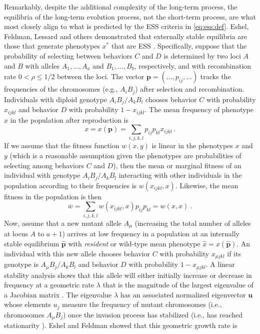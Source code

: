 \documentclass[11pt]{article}
\newcommand{\mean}[1]{\overline{#1}}
\newcommand{\w}{w}
\newcommand{\ess}[1]{#1^*}
\newcommand{\fixp}[1]{\hat{#1}}
\renewcommand{\vec}[1]{\symbf{#1}}
\newcommand{\rec}{\rho}
\newcommand{\mut}{\mu}
\newcommand{\eig}{\lambda}
\begin{document}
Remarkably, despite the additional complexity of the long-term process, the equilibria of the long-term evolution process, not the short-term process, are what most closely align to what is predicted by the ESS criteria in \eqref{eq:ess:def}. Eshel, Feldman, Lessard and others demonstrated that externally stable equilibria are those that generate phenotypes $\ess{x}$ that are ESS \cite{Eshel:Feldman:1984,Liberman:1988,Eshel:1996,Hammerstein:Selten:1994,Hammerstein:1996,Weissing:1996,Eshel:Feldman:1998}. Specifically, suppose that the probability of selecting between behaviors $C$ and $D$ is determined by two loci $A$ and $B$ with alleles $A_{1},\ldots,A_{a}$ and $B_{1},\ldots,B_{b}$, respectively, and with recombination rate $0<\rec\le1/2$ between the loci. The vector $\vec{p} = (\ldots,p_{ij},\ldots)$ tracks the frequencies of the chromosomes (e.g., $A_{i} B_{j}$) after selection and recombination. Individuals with diploid genotype $A_{i}B_{j}/A_{k}B_{l}$ chooses behavior $C$ with probability $x_{ijkl}$ and behavior $D$ with probability $1 - x_{ijkl}$. The mean frequency of phenotype $x$ in the population after reproduction is
\begin{equation*}
  x = x(\vec{p}) = \sum_{i,j,k,l} p_{ij} p_{kl} x_{ijkl} \, .
\end{equation*}
If we assume that the fitness function $\w(x,y)$ is linear in the phenotypes $x$ and $y$ (which is a reasonable assumption given the phenotypes are probabilities of selecting among behaviors $C$ and $D$), then the mean or marginal fitness of an individual with genotype $A_{i}B_{j}/A_{k}B_{l}$ interacting with other individuals in the population according to their frequencies is $w(x_{ijkl}, x)$. Likewise, the mean fitness in the population is then
\begin{equation*}
  \mean{w} = \sum_{i,j,k,l} w(x_{ijkl}, x) p_{ij} p_{kl} = w(x, x) \: .
\end{equation*}
Now, assume that a new mutant allele $A_{\mut}$ (increasing the total number of alleles at locus $A$ to $a+1$) arrives at low frequency in a population at an internally stable equilibrium $\fixp{\vec{p}}$ with \textit{resident} or wild-type mean phenotype $\fixp{x} = x(\fixp{\vec{p}})$. An individual with this new allele chooses behavior $C$ with probability $x_{\mut jkl}$ if its genotype is $A_{\mut}B_{j}/A_{k}B_{l}$ and behavior $D$ with probability $1 - x_{\mut jkl}$. A linear stability analysis shows that this allele will either initially increase or decrease in frequency at a geometric rate $\eig$ that is the magnitude of the largest eigenvalue of a Jacobian matrix \cite{Edelstein-Keshet:2005}. The eigenvalue $\eig$ has an associated normalized eigenvector $\vec{u}$ whose elements $u_{j}$ measure the frequency of mutant chromosomes (i.e., chromosomes $A_{\mut} B_{j}$) once the invasion process has stabilized (i.e., has reached stationarity \cite{Caswell:2006}). Eshel and Feldman \cite{Eshel:Feldman:1984,Eshel:Feldman:1998} showed that this geometric growth rate is
\end{document}
